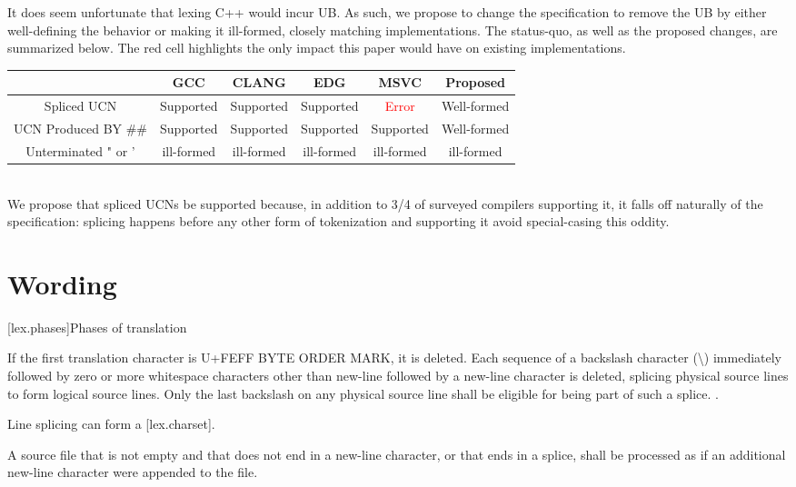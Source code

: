 \documentclass{wg21}
\begin{document}
It does seem unfortunate that lexing C++ would incur UB.
As such, we propose to change the specification to remove the UB by either well-defining the behavior or making it ill-formed,
closely matching implementations.
The status-quo, as well as the proposed changes, are summarized below.
The red cell highlights the only impact this paper would have on existing implementations.

\renewcommand*\arraystretch{1.4}
\begin{tabular}{|c|c|c|c|c|c|}
     \cline{2-6}
    \multicolumn{1}{c|}{} & GCC & CLANG & EDG & MSVC & Proposed \\
    \hline
    Spliced UCN & Supported & Supported & Supported & \textcolor{red}{Error} & Well-formed \\
    \hline
    UCN Produced BY \#\# & Supported & Supported & Supported & Supported & Well-formed \\
    \hline
    Unterminated " or ' & ill-formed & ill-formed & ill-formed & ill-formed & ill-formed \\
    \hline
\end{tabular}\\

We propose that spliced UCNs be supported because, in addition to 3/4 of surveyed compilers supporting it,
it falls off naturally of the specification: splicing happens before any other form of tokenization and supporting it avoid
special-casing this oddity.

\section{Wording}

[lex.phases]{Phases of translation}

%
If the first translation character is U+FEFF BYTE ORDER MARK, it is deleted.
Each sequence of a backslash character (\textbackslash)
immediately followed by
zero or more whitespace characters other than new-line followed by
a new-line character is deleted, splicing
physical source lines to form logical source lines. Only the last
backslash on any physical source line shall be eligible for being part
of such a splice.
.
\begin{addedblock}
\begin{note}
Line splicing can form a  [lex.charset].
\end{note}
\end{addedblock}
A source file that is not empty and that does not end in a new-line
character, or that ends in a splice,
shall be processed as if an additional new-line character were appended
to the file.
\end{document}
